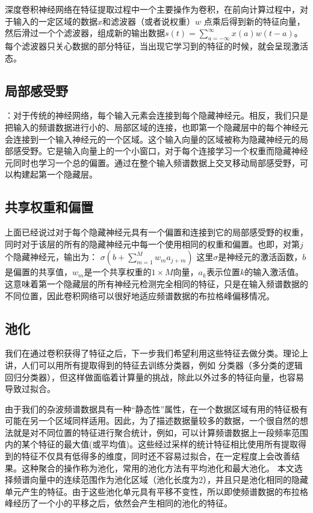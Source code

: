 深度卷积神经网络在特征提取过程中一个主要操作为卷积，在前向计算过程中，对于输入的一定区域的数据$x$和滤波器（或者说权重）$w$ 点乘后得到新的特征向量，然后滑过一个个滤波器，组成新的输出数据$s(t)=\sum_{a=-\infty}^{\infty}x(a)w(t-a) $。每个滤波器只关心数据的部分特征，当出现它学习到的特征的时候，就会呈现激活态。


\subsection{局部感受野}
：对于传统的神经网络，每个输入元素会连接到每个隐藏神经元。相反，我们只是把输入的频谱数据进行小的、局部区域的连接，也即第一个隐藏层中的每个神经元会连接到一个输入神经元的一个区域。这个输入向量的区域被称为隐藏神经元的局部感受野。它是输入向量上的一个小窗口，对于每个连接学习一个权重而隐藏神经元同时也学习一个总的偏置。通过在整个输入频谱数据上交叉移动局部感受野，可以构建起第一个隐藏层。

\subsection{共享权重和偏置}
上面已经说过对于每个隐藏神经元具有一个偏置和连接到它的局部感受野的权重，同时对于该层的所有的隐藏神经元中每一个使用相同的权重和偏置。也即，对第$j$个隐藏神经元，输出为：
$\sigma(b+\sum_{m=1}^M w_m a_{j+m}) $
这里$\sigma$是神经元的激活函数，$b$是偏置的共享值，$w_m$是一个共享权重的$1\times M$向量，$a_k$表示位置$k$的输入激活值。这意味着第一个隐藏层的所有神经元检测完全相同的特征，只是在输入频谱数据的不同位置，因此卷积网络可以很好地适应频谱数据的布拉格峰偏移情况。

\subsection{池化}
我们在通过卷积获得了特征之后，下一步我们希望利用这些特征去做分类。理论上讲，人们可以用所有提取得到的特征去训练分类器，例如 分类器（多分类的逻辑回归分类器），但这样做面临着计算量的挑战，除此以外过多的特征向量，也容易导致过拟合。

由于我们的杂波频谱数据具有一种“静态性”属性，在一个数据区域有用的特征极有可能在另一个区域同样适用。因此，为了描述数据量较多的数据，一个很自然的想法就是对不同位置的特征进行聚合统计，例如，可以计算频谱数据上一段频率范围内的某个特征的最大值(或平均值)。这些经过采样的统计特征相比使用所有提取得到的特征不仅具有低得多的维度，同时还不容易过拟合，在一定程度上会改善结果。这种聚合的操作称为池化，常用的池化方法有平均池化和最大池化。 本文选择频谱向量中的连续范围作为池化区域（池化长度为2），并且只是池化相同的隐藏单元产生的特征。由于这些池化单元具有平移不变性，所以即使频谱数据的布拉格峰经历了一个小的平移之后，依然会产生相同的池化的特征。

